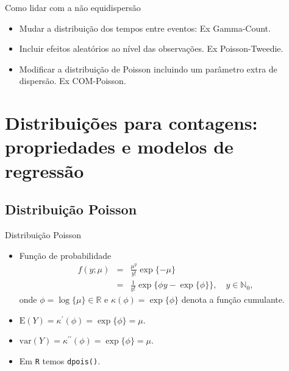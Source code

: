 \documentclass[10pt, aspectratio=169]{beamer}\usepackage[]{graphicx}\usepackage[]{color}
\begin{document}
\begin{frame}{Como lidar com a não equidispersão}
\begin{itemize}
\item Mudar a distribuição dos tempos entre eventos: Ex Gamma-Count. 
\vspace{0,5cm}
\item Incluir efeitos aleatórios ao nível das observações. Ex Poisson-Tweedie.
\vspace{0,5cm}
\item Modificar a distribuição de Poisson incluindo um parâmetro extra
de dispersão. Ex COM-Poisson.
\end{itemize}
\end{frame}

\section{Distribuições para contagens: propriedades e modelos de regressão}
\label{Section2}




\subsection{Distribuição Poisson}

\begin{frame}{Distribuição Poisson}
\begin{itemize}
\item Função de probabilidade
\begin{eqnarray}
f(y;\mu) &=& \frac{\mu^y}{y!}\exp\{-\mu\} \nonumber \\
	     &=& \frac{1}{y!} \exp \{\phi y -  \exp\{\phi\} \}, \quad y \in \mathbb{N}_{0},
\end{eqnarray}
onde $\phi = \log \{\mu\} \in \mathbb{R}$ e $\kappa(\phi) = \exp\{\phi\}$
denota a função cumulante.
\vspace{0,5cm}
\item $\mathrm{E}(Y) = \kappa^{\prime}(\phi) = \exp\{\phi\} = \mu$. 
\vspace{0,5cm}
\item $\mathrm{var}(Y) = \kappa^{\prime \prime}(\phi) = \exp\{\phi\} = \mu$.
\vspace{0,5cm}
\item Em \texttt{R} temos \texttt{dpois()}.

\end{itemize}
\end{frame}
\end{document}
